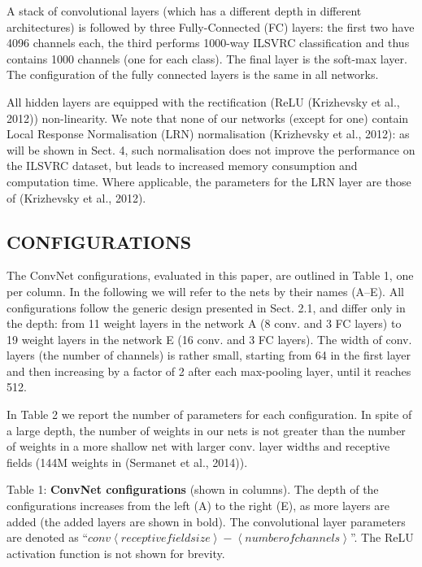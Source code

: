 \documentclass[12pt,a4paper,UTF8,twoside]{book}
\begin{document}
A stack of convolutional layers (which has a different depth in different architectures) is followed by three Fully-Connected (FC) layers: the first two have 4096 channels each, the third performs 1000-way ILSVRC classification and thus contains 1000 channels (one for each class). The final layer is the soft-max layer. The configuration of the fully connected layers is the same in all networks.

All hidden layers are equipped with the rectification (ReLU (Krizhevsky et al., 2012)) non-linearity. We note that none of our networks (except for one) contain Local Response Normalisation (LRN) normalisation (Krizhevsky et al., 2012): as will be shown in Sect. 4, such normalisation does not improve the performance on the ILSVRC dataset, but leads to increased memory consumption and computation time. Where applicable, the parameters for the LRN layer are those of (Krizhevsky et al., 2012).

\hypertarget{configurations}{%
\subsection{CONFIGURATIONS}\label{configurations}}

The ConvNet configurations, evaluated in this paper, are outlined in Table 1, one per column. In the following we will refer to the nets by their names (A--E). All configurations follow the generic design presented in Sect. 2.1, and differ only in the depth: from 11 weight layers in the network A (8 conv. and 3 FC layers) to 19 weight layers in the network E (16 conv. and 3 FC layers). The width of conv. layers (the number of channels) is rather small, starting from 64 in the first layer and then increasing by a factor of 2 after each max-pooling layer, until it reaches 512.

In Table 2 we report the number of parameters for each configuration. In spite of a large depth, the number of weights in our nets is not greater than the number of weights in a more shallow net with larger conv. layer widths and receptive fields (144M weights in (Sermanet et al., 2014)).

Table 1: \textbf{ConvNet configurations} (shown in columns). The depth of the configurations increases from the left (A) to the right (E), as more layers are added (the added layers are shown in bold). The convolutional layer parameters are denoted as ``\(conv \left\langle receptive field size \right\rangle - \left\langle number of channels \right\rangle\)''. The ReLU activation function is not shown for brevity.
\end{document}
